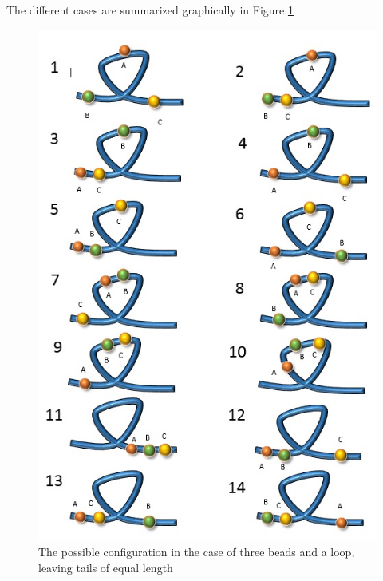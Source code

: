 \documentclass[12pt]{book}
\begin{document}
The different cases are summarized graphically in Figure \ref{figure_possibleArrangementOfThreeBeadsAndAloop}
\begin{figure}[H]
 \includegraphics[scale=0.5]{possibleArrangementOfThreeBeadsAndAloop.jpg}
 \caption{\scriptsize{The possible configuration in the case of three beads and a loop, leaving tails of equal length}}\label{figure_possibleArrangementOfThreeBeadsAndAloop}
\end{figure}
\end{document}
